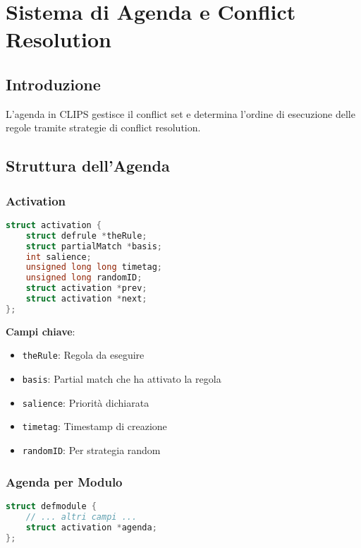 
\chapter{Sistema di Agenda e Conflict Resolution}
\label{cap:clips_agenda}

\section{Introduzione}

L'agenda in CLIPS gestisce il conflict set e determina l'ordine di esecuzione delle regole tramite strategie di conflict resolution.

\section{Struttura dell'Agenda}

\subsection{Activation}

\begin{lstlisting}[language=C]
struct activation {
    struct defrule *theRule;
    struct partialMatch *basis;
    int salience;
    unsigned long long timetag;
    unsigned long randomID;
    struct activation *prev;
    struct activation *next;
};
\end{lstlisting}

\textbf{Campi chiave}:
\begin{itemize}
\item \texttt{theRule}: Regola da eseguire
\item \texttt{basis}: Partial match che ha attivato la regola
\item \texttt{salience}: Priorità dichiarata
\item \texttt{timetag}: Timestamp di creazione
\item \texttt{randomID}: Per strategia random
\end{itemize}

\subsection{Agenda per Modulo}

\begin{lstlisting}[language=C]
struct defmodule {
    // ... altri campi ...
    struct activation *agenda;
};
\end{lstlisting}

